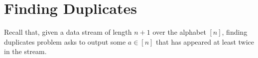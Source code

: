 \section{Finding Duplicates}
\label{sec:duplicates}
Recall that, given a data stream of length $n+1$ over the alphabet $[n]$, finding
duplicates problem asks to output some $a\in[n]$ that has appeared
at least twice in the stream.



